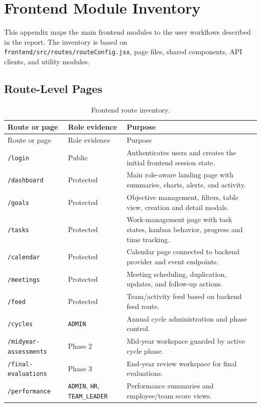 \chapter{Frontend Module Inventory}
This appendix maps the main frontend modules to the user workflows described in the report. The inventory is based on \texttt{frontend/src/routes/routeConfig.jsx}, page files, shared components, API clients, and utility modules.

\section{Route-Level Pages}
\begin{longtable}{p{}p{}p{}}
\caption{Frontend route inventory.}\label{tab:frontend-routes}\\
\toprule
Route or page & Role evidence & Purpose\\
\midrule
\endfirsthead
\toprule
Route or page & Role evidence & Purpose\\
\midrule
\endhead
\texttt{/login} & Public & Authenticates users and creates the initial frontend session state.\\
\texttt{/dashboard} & Protected & Main role-aware landing page with summaries, charts, alerts, and activity.\\
\texttt{/goals} & Protected & Objective management, filters, table view, creation and detail modals.\\
\texttt{/tasks} & Protected & Work-management page with task states, kanban behavior, progress and time tracking.\\
\texttt{/calendar} & Protected & Calendar page connected to backend provider and event endpoints.\\
\texttt{/meetings} & Protected & Meeting scheduling, duplication, updates, and follow-up actions.\\
\texttt{/feed} & Protected & Team/activity feed based on backend feed route.\\
\texttt{/cycles} & \texttt{ADMIN} & Annual cycle administration and phase control.\\
\texttt{/midyear-assessments} & Phase 2 & Mid-year workspace guarded by active cycle phase.\\
\texttt{/final-evaluations} & Phase 3 & End-year review workspace for final evaluations.\\
\texttt{/performance} & \texttt{ADMIN}, \texttt{HR}, \texttt{TEAM\_LEADER} & Performance summaries and employee/team score views.\\

\end{longtable}
